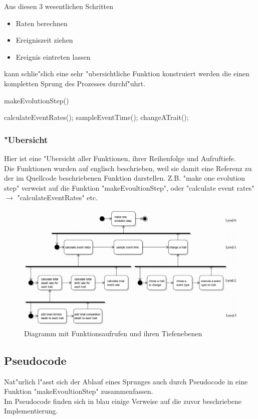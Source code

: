 \documentclass[11pt, a4paper, german]{article}
\theoremstyle{plain}
\begin{document}
	Aus diesen 3 wesentlichen Schritten
	\begin{itemize}
		\item Raten berechnen
		\item Ereigniszeit ziehen
		\item Ereignis eintreten lassen
	\end{itemize}
	kann schlie"slich eine sehr "ubersichtliche Funktion konstruiert werden die einen kompletten Sprung des Prozesses durchf"uhrt.
	\begin{algorithm}[H]
 		\caption{makeEvolutionStep()}
 		\begin{algorithmic}[1]
 			\STATE calculateEventRates();
 			\STATE sampleEventTime();
 			\STATE changeATrait();
 		\end{algorithmic}
 	\end{algorithm}
	 	
	\subsubsection{"Ubersicht}
	Hier ist eine "Ubersicht aller Funktionen, ihrer Reihenfolge und Aufruftiefe. \\
	Die Funktionen wurden auf englisch beschrieben, weil sie damit eine Referenz zu der im Quellcode beschriebenen Funktion darstellen. Z.B. "{}make one evolution step"{} verweist auf die Funktion "{}makeEvoultionStep"{}, oder "{}calculate event rates"{} $ \to $ "{}calculateEventRates"{} etc.
	\begin{figure}[H]
		\centering
		\includegraphics[width=1\linewidth]{../UMLs/PseudoCodeForBThesis}
		\caption{Diagramm mit Funktionsaufrufen und ihren Tiefenebenen}
		\label{fig:PseudoCodeForBThesis}
	\end{figure}
	
	\subsection{Pseudocode}
	Nat"urlich l"asst sich der Ablauf eines Sprunges auch durch Pseudocode in eine Funktion "{}makeEvoultionStep"{} zusammenfassen.\\
	Im Pseudocode finden sich in blau einige Verweise auf die zuvor beschriebene Implementierung.
	
\end{document}
